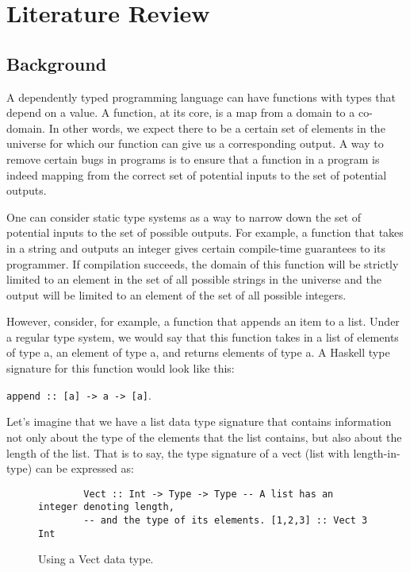 
\chapter{Literature Review}

\section{Background}
A dependently typed programming language can have functions with types that
depend on a value. A function, at its core, is a map from a domain to a
co-domain. In other words, we expect there to be a certain set of elements in
the universe for which our function can give us a corresponding output. A way to
remove certain bugs in programs is to ensure that a function in a program is
indeed mapping from the correct set of potential inputs to the set of potential
outputs. 

One can consider static type systems as a way to narrow down the set of
potential inputs to the set of possible outputs. For example, a function that
takes in a string and outputs an integer gives certain compile-time guarantees
to its programmer. If compilation succeeds, the domain of this function will be
strictly limited to an element in the set of all possible strings in the
universe and the output will be limited to an element of the set of all possible
integers. 

However, consider, for example, a function that appends an item to a list. Under
a regular type system, we would say that this function takes in a list of
elements of type a, an element of type a, and returns elements of type a. A
Haskell type signature for this function would look like this: 

\texttt{append :: [a] -> a -> [a]}. 


Let's imagine that we have a list data type signature that contains information
not only about the type of the elements that the list contains, but also about
the length of the list. That is to say, the type signature of a vect (list with
length-in-type) can be expressed as: 

\begin{figure}
    \caption{Using a Vect data type.}
    \begin{lstlisting}
        Vect :: Int -> Type -> Type -- A list has an integer denoting length, 
        -- and the type of its elements. [1,2,3] :: Vect 3 Int
    \end{lstlisting}
\end{figure} 


